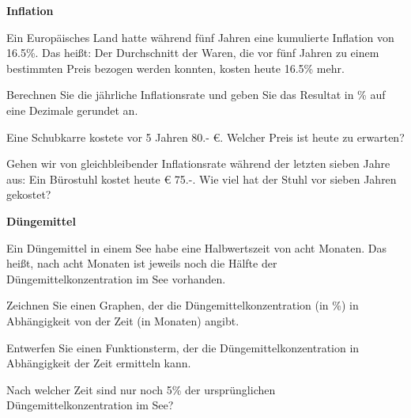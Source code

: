 
\bbwActAufgabenNr{} \textbf{Inflation}

 Ein Europäisches Land hatte während fünf Jahren eine kumulierte
 Inflation von 16.5\%. Das heißt: Der Durchschnitt der Waren, die vor fünf Jahren zu einem
 bestimmten Preis bezogen werden konnten, kosten heute 16.5\% mehr.
 
\begin{bbwAufgabenBlock}

\item Berechnen Sie die jährliche Inflationsrate und geben Sie das
  Resultat in \% auf eine Dezimale gerundet an.


    \item Eine Schubkarre kostete vor 5 Jahren 80.- \euro{}. Welcher
      Preis ist heute zu erwarten?

    \item Gehen wir von gleichbleibender Inflationsrate während der
      letzten sieben Jahre aus: Ein Bürostuhl kostet heute \euro{}
      75.-. Wie viel hat der Stuhl vor sieben Jahren gekostet?

      
\end{bbwAufgabenBlock}
\platzFuerBerechnungenBisEndeSeite{}



\bbwActAufgabenNr{} \textbf{Düngemittel}

Ein Düngemittel in einem See habe eine Halbwertszeit von acht
Monaten. Das heißt, nach acht Monaten ist jeweils noch die Hälfte der
Düngemittelkonzentration im See vorhanden.

\begin{bbwAufgabenBlock}

\item Zeichnen Sie einen Graphen, der die Düngemittelkonzentration (in \%)
  in Abhängigkeit von der Zeit (in Monaten) angibt.


  
    \item Entwerfen Sie einen Funktionsterm, der die
      Düngemittelkonzentration in Abhängigkeit der Zeit ermitteln
      kann.


    \item Nach welcher Zeit sind nur noch 5\% der ursprünglichen
      Düngemittelkonzentration im See?

      
\end{bbwAufgabenBlock}
\platzFuerBerechnungenBisEndeSeite{}





\newpage
